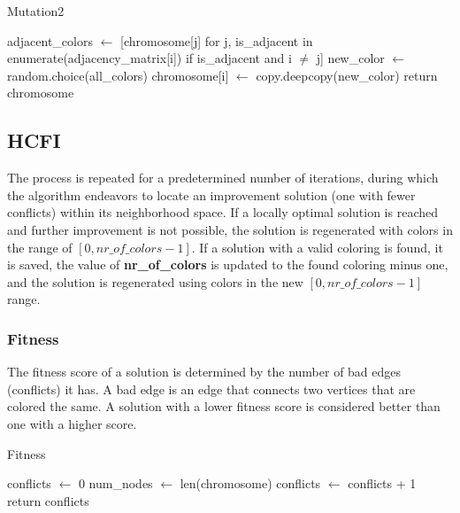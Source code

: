 \documentclass[10pt]{article}
\begin{document}
\begin{algorithm}[H]
\caption{Mutation2}
\begin{algorithmic}[1]
\State adjacent\_colors $\gets$ [chromosome[j] for j, is\_adjacent in enumerate(adjacency\_matrix[i]) if is\_adjacent and i $\neq$ j]
\State new\_color $\gets$ random.choice(all\_colors)
\State chromosome[i] $\gets$ copy.deepcopy(new\_color)
\EndIf
\EndFor
\EndIf
\State return chromosome
\EndFunction
\end{algorithmic}
\end{algorithm}

\subsection{HCFI}
The process is repeated for a predetermined number of iterations, during which the algorithm endeavors to locate an improvement solution (one with fewer conflicts) within its neighborhood space. If a locally optimal solution is reached and further improvement is not possible, the solution is regenerated with colors in the range of $[0,nr\_of\_colors-1]$. If a solution with a valid coloring is found, it is saved, the value of \textbf{nr\_of\_colors} is updated to the found coloring minus one, and the solution is regenerated using colors in the new $[0,nr\_of\_colors-1]$ range.
\subsubsection{Fitness}
The fitness score of a solution is determined by the number of bad edges (conflicts) it has. A bad edge is an edge that connects two vertices that are colored the same. A solution with a lower fitness score is considered better than one with a higher score.

\begin{algorithm}[H]
\caption{Fitness}
\begin{algorithmic}[1]
\State conflicts $\gets$ 0
\State num\_nodes $\gets$ len(chromosome)
\State conflicts $\gets$ conflicts + 1
\EndIf
\EndFor
\EndFor
\State return conflicts
\EndProcedure

\end{algorithmic}
\end{algorithm}
\end{document}
